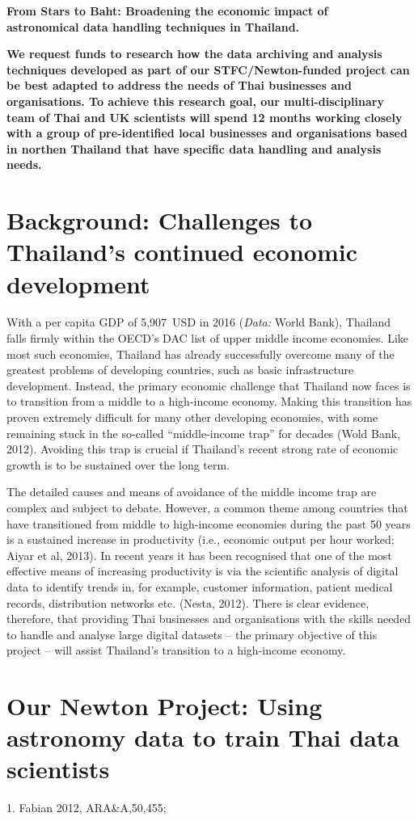 \documentclass[11pt]{article}
\begin{document}
\setcounter{figure}{0}
\noindent
{\LARGE \bf From Stars to Baht: Broadening the economic impact of \\
astronomical data handling techniques in Thailand.}
\vspace{3mm}

\noindent
{\bf We request funds to research how the data archiving and analysis techniques developed as part of our STFC/Newton-funded project can be best adapted to address the needs of Thai businesses and organisations. To achieve this research goal, our multi-disciplinary team of Thai and UK scientists will spend 12 months working closely with a group of pre-identified local businesses and organisations based in northen Thailand that have specific data handling and analysis needs.}

\section{Background: Challenges to Thailand's continued economic development}
With a per capita GDP of 5,907~USD in 2016 ({\it Data:} World Bank), Thailand falls firmly within the OECD's DAC list of upper middle income economies. Like most such economies, Thailand has already successfully overcome many of the greatest problems of developing countries, such as basic infrastructure development. Instead, the primary economic challenge that Thailand now faces is to transition from a middle to a high-income economy. Making this transition has proven extremely difficult for many other developing economies, with some remaining stuck in the so-called ``middle-income trap'' for decades (Wold Bank, 2012). Avoiding this trap is crucial if Thailand's recent strong rate of economic growth is to be sustained over the long term.     

The detailed causes and means of avoidance of the middle income trap are complex and subject to debate. However, a common theme among countries that have transitioned from middle to high-income economies during the past 50 years is a sustained increase in productivity (i.e., economic output per hour worked; Aiyar et al, 2013). In recent years it has been recognised that one of the most effective means of increasing productivity is via the scientific analysis of digital data to identify trends in, for example, customer information, patient medical records, distribution networks etc. (Nesta, 2012). There is clear evidence, therefore, that providing Thai businesses and organisations with the skills needed to handle and analyse large digital datasets -- the primary objective of this project -- will assist Thailand's transition to a high-income economy.

\section{Our Newton Project: Using astronomy data to train Thai data scientists}

\vspace{10mm}
 {\scriptsize 1. Fabian 2012,
  ARA\&A,50,455;
}
\end{document}
